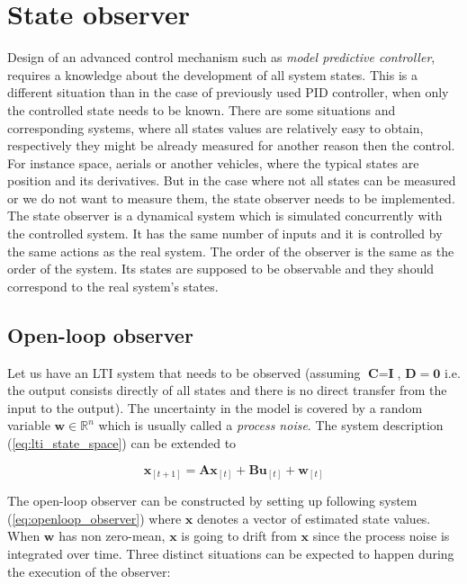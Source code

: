 \section{State observer}

Design of an advanced control mechanism such as \textit{model predictive controller}, requires a knowledge about the development of all system states. This is a different situation than in the case of previously used PID controller, when only the controlled state needs to be known. There are some situations and corresponding systems, where all states values are relatively easy to obtain, respectively they might be already measured for another reason then the control. For instance space, aerials or another vehicles, where the typical states are position and its derivatives. But in the case where not all states can be measured or we do not want to measure them, the state observer needs to be implemented. The state observer is a dynamical system which is simulated concurrently with the controlled system. It has the same number of inputs and it is controlled by the same actions as the real system. The order of the observer is the same as the order of the system. Its states are supposed to be observable and they should correspond to the real system's states.

\subsection{Open-loop observer}

Let us have an LTI system that needs to be observed (assuming $\textbf{C} = \textbf{I}$, $\textbf{D} = \mathbf{0}$ i.e. the output consists directly of all states and there is no direct transfer from the input to the output). The uncertainty in the model is covered by a random variable $\textbf{w} \in \mathbb{R}^n$ which is usually called a \emph{process noise}. The system description (\ref{eq:lti_state_space}) can be extended to

\begin{equation}
\textbf{x}_{[t+1]} = \textbf{A}\textbf{x}_{[t]} + \textbf{B}\textbf{u}_{[t]} + \textbf{w}_{[t]}
\label{eq:lti_for_observer}
\end{equation}

The open-loop observer can be constructed by setting up following system (\ref{eq:openloop_observer}) where $\textbf{\^x}$ denotes a vector of estimated state values. When $\textbf{w}$ has non zero-mean, $\textbf{\^x}$ is going to drift from $\textbf{x}$ since the process noise is integrated over time. Three distinct situations can be expected to happen during the execution of the observer:

